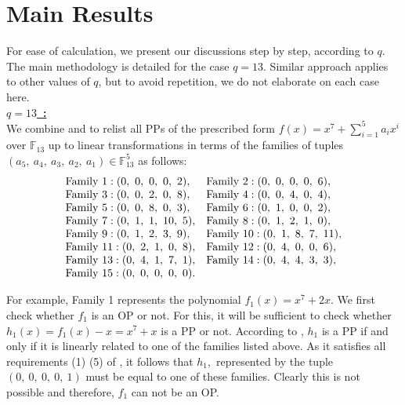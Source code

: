 \documentclass[12pt,a4wide, reqno]{amsart}
\theoremstyle{definition}
\theoremstyle{remark}
\numberwithin{equation}{section}
\begin{document}
\section{Main Results}
For ease of calculation, we present our discussions step by step, according to $q.$ The main methodology is detailed for the case $q=13.$ Similar approach applies to other values of $q$, but to avoid repetition, we do not elaborate on each case here.
\vspace{0.5 cm}
\\
\underline{\Large \textbf{$q=13$~:}}
\vspace{0.2cm}
\\
We combine  and  to relist all PPs of the prescribed form $f(x)=x^7+\sum_{i=1}^{5}a_ix^i$ over $\mathbb{F}_{13}$ up to linear transformations in terms of the families of tuples $(a_5,~a_4,~a_3,~a_2,~a_1)\in\mathbb{F}_{13}^5$ as follows:
\begin{equation}
\begin{matrix*}[l]
     \textup{Family 1}:(0,~0,~0,~0,~2), & \textup{Family 2}:(0,~0,~0,~0,~6),\\
     \textup{Family 3}: (0,~0,~2,~0,~8),&\textup{Family 4}:(0,~0,~4,~0,~4), \\
     \textup{Family 5}:(0,~0,~8,~0,~3),& \textup{Family 6}: (0,~1,~0,~0,~2),\\
     \textup{Family 7}:(0,~1,~1,~10,~5),& \textup{Family 8}:(0,~1,~2,~1,~0),\\
 \textup{Family 9}:(0,~1,~2,~3,~9),& \textup{Family 10}:(0,~1,~8,~7,~11),\\
 \textup{Family 11}:(0,~2,~1,~0,~8), & \textup{Family 12}:(0,~4,~0,~0,~6),\\
 \textup{Family 13}:(0,~4,~1,~7,~1),& \textup{Family 14}:(0,~4,~4,~3,~3), \\
 \textup{Family 15}:(0,~0,~0,~0,~0). &  \\
\end{matrix*}
\label{eq1}
\end{equation}

For example, Family 1 represents the polynomial $f_1(x)=x^7+2x.$ We first check whether $f_1$ is an OP or not. For this, it will be sufficient to check whether $h_1(x)=f_1(x)-x=x^7+x$ is a PP or not. According to , $h_1$ is a PP if and only if it is linearly related to one of the families listed above. As it satisfies all requirements (1) \textendash (5) of , it follows that $h_1,$ represented by the tuple $(0,~0,~0,~0,~1)$ must be equal to one of these families. Clearly this is not possible and therefore, $f_1$ can not be an OP.
\end{document}
